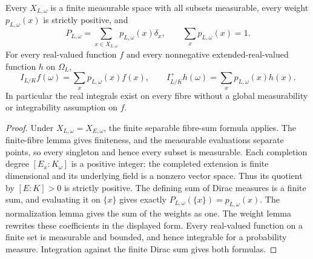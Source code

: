 \begin{lemma}
\label{lem:finite-fibre-sum}
\leanok
{}
Every $X_{L,\omega}$ is a finite measurable space with all subsets
measurable, every weight $p_{L,\omega}(x)$ is strictly positive, and
\[
 P_{L,\omega}=\sum_{x\in X_{L,\omega}}p_{L,\omega}(x)\delta_x,
 \qquad \sum_xp_{L,\omega}(x)=1.
\]
For every real-valued function $f$ and every nonnegative
extended-real-valued function $h$ on $\Omega_L$,
\[
 I_{L/K}f(\omega)=\sum_xp_{L,\omega}(x)f(x),\qquad
 I^+_{L/K}h(\omega)=\sum_xp_{L,\omega}(x)h(x).
\]
In particular the real integrals exist on every fibre without a
global measurability or integrability assumption on $f$.
\end{lemma}
\begin{proof}
Under $X_{L,\omega}=X_{E,\omega}$, the finite separable fibre-sum
formula applies. The finite-fibre lemma gives finiteness, and the
measurable evaluations separate points, so every singleton and hence
every subset is measurable. Each completion degree $[E_x:K_\omega]$
is a positive integer: the completed extension is finite dimensional
and its underlying field is a nonzero vector space. Thus its quotient
by $[E:K]>0$ is strictly positive. The defining sum of Dirac measures
is a finite sum, and evaluating it on $\{x\}$ gives exactly
$P_{L,\omega}(\{x\})=p_{L,\omega}(x)$. The normalization lemma
gives the sum of the weights as one. The weight lemma rewrites these
coefficients in the displayed form.
Every real-valued function on a finite set is
measurable and bounded, and hence integrable for a probability
measure. Integration against the finite Dirac sum gives both formulas.
\end{proof}

